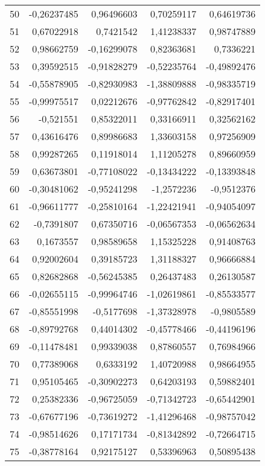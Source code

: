 \begin{longtable}{lrrrr}
 50 & -0,26237485 & 0,96496603 & 0,70259117 & 0,64619736 \\
 51 & 0,67022918 &  0,7421542 & 1,41238337 & 0,98747889 \\
 52 & 0,98662759 & -0,16299078 & 0,82363681 &  0,7336221 \\
 53 & 0,39592515 & -0,91828279 & -0,52235764 & -0,49892476 \\
 54 & -0,55878905 & -0,82930983 & -1,38809888 & -0,98335719 \\
 55 & -0,99975517 & 0,02212676 & -0,97762842 & -0,82917401 \\
 56 &  -0,521551 & 0,85322011 & 0,33166911 & 0,32562162 \\
 57 & 0,43616476 & 0,89986683 & 1,33603158 & 0,97256909 \\
 58 & 0,99287265 & 0,11918014 & 1,11205278 & 0,89660959 \\
 59 & 0,63673801 & -0,77108022 & -0,13434222 & -0,13393848 \\
 60 & -0,30481062 & -0,95241298 & -1,2572236 & -0,9512376 \\
 61 & -0,96611777 & -0,25810164 & -1,22421941 & -0,94054097 \\
 62 & -0,7391807 & 0,67350716 & -0,06567353 & -0,06562634 \\
 63 &  0,1673557 & 0,98589658 & 1,15325228 & 0,91408763 \\
 64 & 0,92002604 & 0,39185723 & 1,31188327 & 0,96666884 \\
 65 & 0,82682868 & -0,56245385 & 0,26437483 & 0,26130587 \\
 66 & -0,02655115 & -0,99964746 & -1,02619861 & -0,85533577 \\
 67 & -0,85551998 & -0,5177698 & -1,37328978 & -0,9805589 \\
 68 & -0,89792768 & 0,44014302 & -0,45778466 & -0,44196196 \\
 69 & -0,11478481 & 0,99339038 & 0,87860557 & 0,76984966 \\
 70 & 0,77389068 &  0,6333192 & 1,40720988 & 0,98664955 \\
 71 & 0,95105465 & -0,30902273 & 0,64203193 & 0,59882401 \\
 72 & 0,25382336 & -0,96725059 & -0,71342723 & -0,65442901 \\
 73 & -0,67677196 & -0,73619272 & -1,41296468 & -0,98757042 \\
 74 & -0,98514626 & 0,17171734 & -0,81342892 & -0,72664715 \\
 75 & -0,38778164 & 0,92175127 & 0,53396963 & 0,50895438 \\

\end{longtable}
